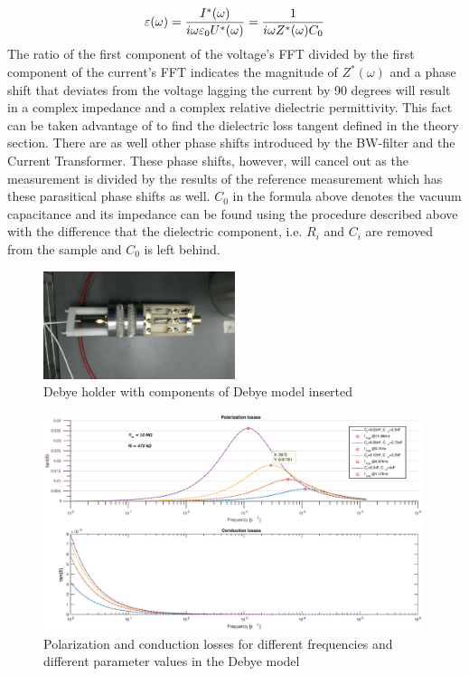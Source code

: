 \begin{equation}
\varepsilon(\omega)=\frac{I^*(\omega)}{i \omega \varepsilon_0 U^*(\omega)} = \frac{1}{i \omega Z^*(\omega) C_0}\\
\end{equation}
The ratio of the first component of the voltage's FFT divided by the first component of the current's FFT indicates the magnitude
of $Z^*(\omega)$ and a phase shift that deviates from the voltage lagging the current by 90 degrees will result in a complex impedance and a complex relative dielectric permittivity. This fact can be taken advantage of to find the dielectric loss tangent defined in the theory section. There are as well other phase shifts introduced by the BW-filter and the Current Transformer. These phase shifts, however, will cancel out as the measurement is divided by the results of the reference measurement which has these parasitical phase shifts as well. 
\newline
$C_0$ in the formula above denotes the vacuum capacitance and its impedance can be found using the procedure described above with the difference that
the dielectric component, i.e. $R_i$ and $C_i$ are removed from the sample and $C_0$ is left behind.

\begin{figure}[h!tb]
 \centering

 \includegraphics[width=0.5\textwidth]{figures/Method/Experimentaufbau/debyesample}
 \caption[Kurze Abbildungsbeschreibung]{Debye holder with components of Debye model inserted}

 
 
 \end{figure}

\begin{figure}
\includegraphics[width=0.99\textwidth]{figures/Method/Dielectric_loss/polarizationmultiple.eps}
    \caption{Polarization and conduction losses for different frequencies and different parameter values in the Debye model}
    \label{fig.debye-modell}
   \end{figure}

